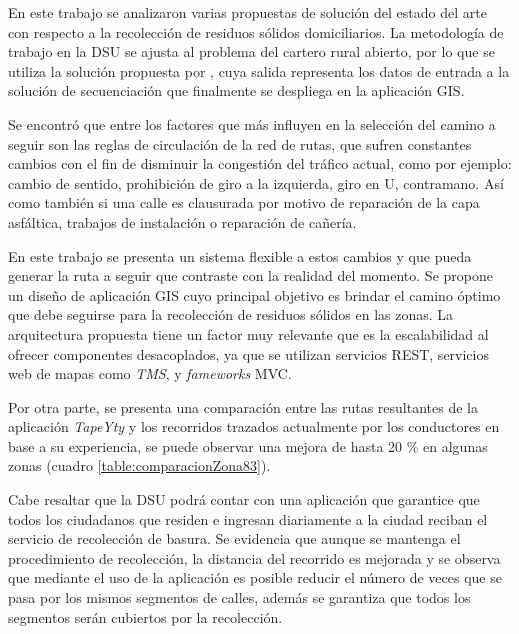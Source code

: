 
En este trabajo se analizaron varias propuestas de solución del estado del arte con respecto a la recolección de residuos sólidos domiciliarios. La metodología de trabajo en la DSU se ajusta al problema del cartero rural abierto, por lo que se utiliza la solución propuesta por \citet{Braier2017AnArgentina}, cuya salida representa los datos de entrada a la solución de secuenciación que finalmente se despliega en la aplicación GIS.

Se encontró que entre los factores que más influyen en la selección del camino a seguir son las reglas de circulación de la red de rutas, que sufren constantes cambios con el fin de disminuir la congestión del tráfico actual, como por ejemplo: cambio de sentido, prohibición de giro a la izquierda, giro en U, contramano. Así como también si una calle es clausurada por motivo de reparación de la capa asfáltica, trabajos de instalación o reparación de cañería.

En este trabajo se presenta un sistema flexible a estos cambios y que pueda generar la ruta a seguir que contraste con la realidad del momento. Se propone un diseño de aplicación GIS cuyo principal objetivo es brindar el camino óptimo que debe seguirse para la recolección de residuos sólidos en las zonas. La arquitectura propuesta tiene un factor muy relevante que es la escalabilidad al ofrecer componentes desacoplados, ya que se utilizan servicios REST, servicios web de mapas como \textit{TMS}, y \textit{fameworks} MVC.

Por otra parte, se presenta una comparación entre las rutas resultantes de la aplicación \textit{TapeYty} y los recorridos trazados actualmente por los conductores en base a su experiencia, se puede observar una mejora de hasta 20 \% en algunas zonas (cuadro \ref{table:comparacionZona83}).

Cabe resaltar que la DSU podrá contar con una aplicación que garantice que todos los ciudadanos que residen e ingresan diariamente a la ciudad reciban el servicio de recolección de basura. Se evidencia que aunque se mantenga el procedimiento de recolección, la distancia del recorrido es mejorada y se observa que mediante el uso de la aplicación es posible reducir el número de veces que se pasa por los mismos segmentos de calles, además se garantiza que todos los segmentos serán cubiertos por la recolección.

